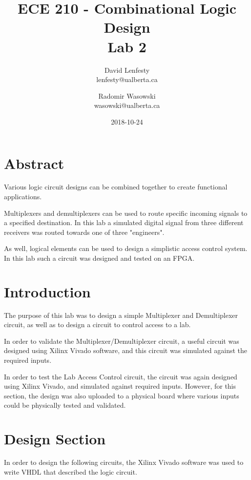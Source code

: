 \documentclass{article}
\title{ECE 210 - Combinational Logic Design \\ Lab 2}
\date{2018-10-24}
\author{David Lenfesty \\ lenfesty@ualberta.ca
    \and Radomir Wasowski \\ wasowski@ualberta.ca}
\begin{document}
    \doublespacing
    \maketitle
    \newpage

    \tableofcontents
    \newpage


    \singlespacing

    \section{Abstract}

    Various logic circuit designs can be combined together to create
    functional applications.

    Multiplexers and demultiplexers can be used to route specific
    incoming signals to a specified destination. In this lab a simulated
    digital signal from three different receivers was routed towards
    one of three "engineers".
    
    As well, logical elements can be used to design a simplistic access control system.
    In this lab such a circuit was designed and tested on an FPGA.

    \section{Introduction}

    The purpose of this lab was to design a simple Multiplexer and Demultiplexer circuit,
    as well as to design a circuit to control access to a lab.

    In order to validate the Multiplexer/Demultiplexer circuit,
    a useful circuit was designed using Xilinx Vivado software,
    and this circuit was simulated against the required inputs.

    In order to test the Lab Access Control circuit, the circuit was again designed
    using Xilinx Vivado, and simulated against required inputs.
    However, for this section, the design was also uploaded to a physical board
    where various inputs could be physically tested and validated.

    \section{Design Section}

    In order to design the following circuits, the Xilinx Vivado software
    was used to write VHDL that described the logic circuit.
\end{document}
